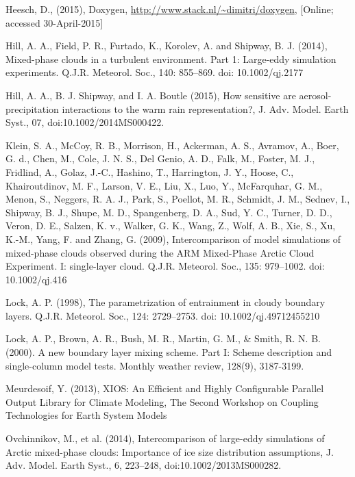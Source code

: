 \documentclass[a4paper,11pt]{article}
\begin{document}
\begin{thebibliography}{}
\item{Heesch, D., (2015), Doxygen, \url{http://www.stack.nl/~dimitri/doxygen}, [Online; accessed 30-April-2015]}

\item{Hill, A. A., Field, P. R., Furtado, K., Korolev, A. and Shipway, B. J. (2014), Mixed-phase clouds in a turbulent environment. Part 1: Large-eddy simulation experiments. Q.J.R. Meteorol. Soc., 140: 855–869. doi: 10.1002/qj.2177}

\item{Hill, A. A., B. J. Shipway, and I. A. Boutle (2015), How sensitive are aerosol-precipitation interactions to the warm rain representation?, J. Adv. Model. Earth Syst., 07, doi:10.1002/2014MS000422.}

\item{Klein, S. A., McCoy, R. B., Morrison, H., Ackerman, A. S., Avramov, A., Boer, G. d., Chen, M., Cole, J. N. S., Del Genio, A. D., Falk, M., Foster, M. J., Fridlind, A., Golaz, J.-C., Hashino, T., Harrington, J. Y., Hoose, C., Khairoutdinov, M. F., Larson, V. E., Liu, X., Luo, Y., McFarquhar, G. M., Menon, S., Neggers, R. A. J., Park, S., Poellot, M. R., Schmidt, J. M., Sednev, I., Shipway, B. J., Shupe, M. D., Spangenberg, D. A., Sud, Y. C., Turner, D. D., Veron, D. E., Salzen, K. v., Walker, G. K., Wang, Z., Wolf, A. B., Xie, S., Xu, K.-M., Yang, F. and Zhang, G. (2009), Intercomparison of model simulations of mixed-phase clouds observed during the ARM Mixed-Phase Arctic Cloud Experiment. I: single-layer cloud. Q.J.R. Meteorol. Soc., 135: 979–1002. doi: 10.1002/qj.416}

\item{Lock, A. P. (1998), The parametrization of entrainment in cloudy boundary layers. Q.J.R. Meteorol. Soc., 124: 2729–2753. doi: 10.1002/qj.49712455210}

\item{Lock, A. P., Brown, A. R., Bush, M. R., Martin, G. M., \& Smith, R. N. B. (2000). A new boundary layer mixing scheme. Part I: Scheme description and single-column model tests. Monthly weather review, 128(9), 3187-3199.}

\item{Meurdesoif, Y. (2013), XIOS: An Efficient and Highly Configurable Parallel Output Library for Climate Modeling, The Second Workshop on Coupling Technologies for Earth System Models}

\item{Ovchinnikov, M., et al. (2014), Intercomparison of large-eddy simulations of Arctic mixed-phase clouds: Importance of
    ice size distribution assumptions, J. Adv. Model. Earth Syst., 6, 223–248, doi:10.1002/2013MS000282. }


\end{thebibliography}
\end{document}
